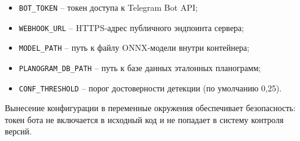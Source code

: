{\begin{itemize}[leftmargin=2.15cm, labelwidth=0.65cm, labelsep=0.0cm]
		\item[•] \texttt{BOT\_TOKEN} {--} токен доступа к Telegram Bot API;
		\item[•] \texttt{WEBHOOK\_URL} {--} HTTPS-адрес публичного эндпоинта сервера;
		\item[•] \texttt{MODEL\_PATH} {--} путь к файлу ONNX-модели внутри контейнера;
		\item[•] \texttt{PLANOGRAM\_DB\_PATH} {--} путь к базе данных эталонных планограмм;
		\item[•] \texttt{CONF\_THRESHOLD} {--} порог достоверности детекции (по умолчанию 0,25).

	\end{itemize}

	\par \redline Вынесение конфигурации в переменные окружения обеспечивает безопасность: токен бота не включается в исходный код и не попадает в систему контроля версий.
	\par
}

